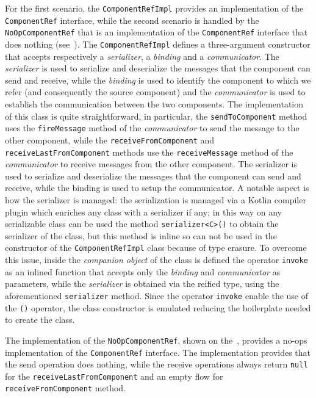 For the first scenario, the \texttt{ComponentRefImpl} provides an implementation of the \texttt{ComponentRef} interface, while the second scenario is
handled by the \texttt{NoOpComponentRef} that is an implementation of the \texttt{ComponentRef} interface that does nothing
(see~).
The \texttt{ComponentRefImpl} defines a three-argument constructor that accepts respectively a \emph{serializer}, a \emph{binding} and a
\emph{communicator}. The \emph{serializer} is used to serialize and deserialize the messages that the component can send and receive, while the
\emph{binding} is used to identify the component to which we refer (and consequently the source component) and the \emph{communicator} is used to
establish the communication between the two components.
The implementation of this class is quite straightforward, in particular, the \texttt{sendToComponent} method uses the \texttt{fireMessage} method of
the \emph{communicator} to send the message to the other component, while the \texttt{receiveFromComponent} and \texttt{receiveLastFromComponent}
methods use the \texttt{receiveMessage} method of the \emph{communicator} to receive messages from the other component.
The serializer is used to serialize and deserialize the messages that the component can send and receive, while the binding is used to
setup the communicator.
A notable aspect is how the serializer is managed: the serialization is managed via a Kotlin compiler plugin which enriches any class with
a serializer if any; in this way on any serializable class can be used the method \texttt{serializer<C>()} to obtain the serializer of the class,
but this method is inline so can not be used in the constructor of the \texttt{ComponentRefImpl} class because of type erasure.
To overcome this issue, inside the \emph{companion object} of the class is defined the operator \texttt{invoke} as an inlined function that
accepts only the \emph{binding} and \emph{communicator} as parameters, while the \emph{serializer} is obtained via the reified type, using the aforementioned \texttt{serializer} method. Since the operator \texttt{invoke} enable the use of the \texttt{()} operator, the class constructor is
emulated reducing the boilerplate needed to create the class.



The implementation of the \texttt{NoOpComponentRef}, shown on the~, provides a no-ops implementation of the
\texttt{ComponentRef} interface. The implementation provides that the send operation does nothing, while the receive operations always return
\texttt{null} for the \texttt{receiveLastFromComponent} and an empty flow for \texttt{receiveFromComponent} method.

